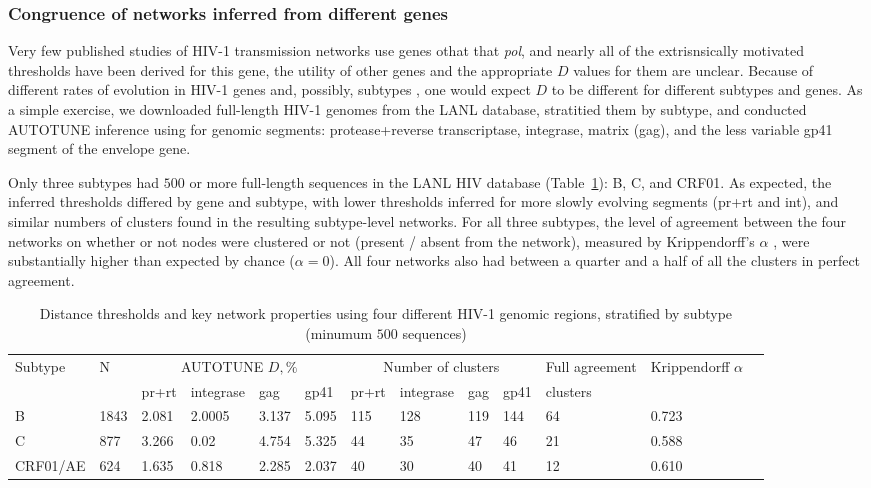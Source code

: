\documentclass[utf8]{FrontiersinHarvard} %
\begin{document}
\subsubsection{Congruence of networks inferred from different genes}

Very few published studies of HIV-1 transmission networks use genes othat that {\it pol}, and nearly all of the extrisnsically motivated thresholds have been derived for this gene, the utility of other genes and the appropriate $D$ values for them are unclear.  Because of different rates of evolution in HIV-1 genes and, possibly, subtypes \cite{Penn:2008aa}, one would expect $D$ to be different for different subtypes and genes. As a simple exercise, we downloaded full-length HIV-1 genomes from the LANL database, stratitied them by subtype, and conducted AUTOTUNE inference using for genomic segments: protease+reverse transcriptase, integrase, matrix (gag), and the less variable gp41 segment of the envelope gene. 

Only three subtypes had $500$ or more full-length sequences in the LANL HIV database (Table~\ref{tab:LANL:full}): B, C, and CRF01. As expected, the inferred thresholds differed by gene and subtype, with lower thresholds inferred for more slowly evolving segments (pr+rt and int), and similar numbers of clusters found in the resulting subtype-level networks. For all three subtypes, the level of agreement between the four networks on whether or not nodes were clustered or not (present / absent from the network), measured by Krippendorff's $\alpha$ \cite{doi:10.1080/19312450709336664}, were substantially higher than expected by chance ($\alpha = 0$). All four networks also had between a quarter and a half of all the clusters in perfect agreement. 

\begin{table}[h]
	\caption{Distance thresholds and key network properties using four different HIV-1 genomic regions, stratified by subtype (minumum $500$ sequences)}
	
	\vspace{10pt}
	\centering
	\begin{ssmall}
	\label{tab:LANL:full}
	\begin{tabular}{lllllllllllll}
	   \hline
		Subtype & N &  \multicolumn{4}{c}{AUTOTUNE $D, \%$} & \multicolumn{4}{c}{Number of clusters} & Full agreement & Krippendorff $\alpha$\\
		& & pr+rt & integrase & gag & gp41 & pr+rt & integrase & gag & gp41 & clusters &  \\
		\hline

		B & 1843 & 2.081 & 2.0005 & 3.137 & 5.095 & 115 & 128 & 119 & 144 & 64 &  0.723\\
		C & 877 & 3.266 & 0.02 & 4.754 & 5.325 & 44 & 35 & 47 & 46 & 21 & 0.588\\
		CRF01/AE & 624 & 1.635 & 0.818 & 2.285 & 2.037 & 40 & 30& 40 & 41 & 12 &  0.610 \\
								
		\hline
	\end{tabular}
	\end{ssmall}
\end{table}
\end{document}
